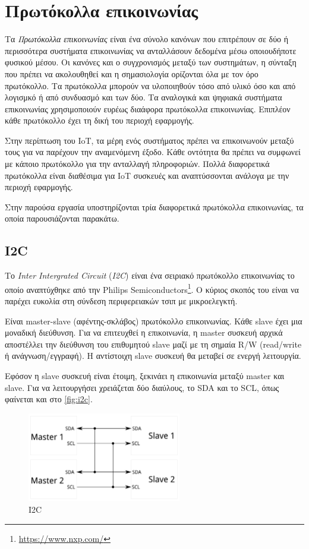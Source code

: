 \section{Πρωτόκολλα επικοινωνίας}
\label{sec:theory_protocols}

Τα \textit{Πρωτόκολλα επικοινωνίας} είναι ένα σύνολο κανόνων που επιτρέπουν σε δύο ή περισσότερα συστήματα επικοινωνίας να ανταλλάσουν δεδομένα μέσω οποιουδήποτε φυσικού μέσου. Οι κανόνες και ο συγχρονισμός μεταξύ των συστημάτων, η σύνταξη που πρέπει να ακολουθηθεί και η σημασιολογία ορίζονται όλα με τον όρο πρωτόκολλο. Τα πρωτόκολλα μπορούν να υλοποιηθούν τόσο από υλικό όσο και από λογισμκό ή από συνδυασμό και των δύο. Τα αναλογικά και ψηφιακά συστήματα επικοινωνίας χρησιμοποιούν ευρέως διαάφορα πρωτόκολλα επικοινωνίας. Επιπλέον κάθε πρωτόκολλο έχει τη δική του περιοχή εφαρμογής.

Στην περίπτωση του IoT, τα μέρη ενός συστήματος πρέπει να επικοινωνούν μεταξύ τους για να παρέχουν την αναμενόμενη έξοδο. Κάθε οντότητα θα πρέπει να συμφωνεί με κάποιο πρωτόκολλο για την ανταλλαγή πληροφοριών. Πολλά διαφορετικά πρωτόκολλα είναι διαθέσιμα για IoT συσκευές και αναπτύσσονται ανάλογα με την περιοχή εφαρμογής.

Στην παρούσα εργασία υποστηρίζονται τρία διαφορετικά πρωτόκολλα επικοινωνίας, τα οποία παρουσιάζονται παρακάτω.

\subsection{I2C}
\label{subsec:i2c}

Το \textit{Inter Intergrated Circuit} (\textit{I2C}) είναι ένα σειριακό πρωτόκολλο επικοινωνίας το οποίο αναπτύχθηκε από την Philips Semiconductors\footnote{\url{https://www.nxp.com/}}. Ο κύριος σκοπός του είναι να παρέχει ευκολία στη σύνδεση περιφερειακών τσιπ με μικροελεγκτή. 

Είναι master-slave (αφέντης-σκλάβος) πρωτόκολλο επικοινωνίας. Κάθε slave έχει μια μοναδική διεύθυνση. Για να επιτευχθεί η επικοινωνία, η master συσκευή αρχικά αποστέλλει την διεύθυνση του επιθυμητού slave μαζί με τη σημαία R/W (read/write ή ανάγνωση/εγγραφή). Η αντίστοιχη slave συσκευή θα μεταβεί σε ενεργή λειτουργία.

Εφόσον η slave συσκευή είναι έτοιμη, ξεκινάει η επικοινωνία μεταξύ master και slave. Για να λειτουργήσει χρειάζεται δύο διαύλους, το SDA και το SCL, όπως φαίνεται και στο \autoref{fig:i2c}.

\begin{figure}[!ht]
	\centering
	\includegraphics[width=0.6\textwidth]{./images/chapter2/i2c.png}
	\caption{I2C}
	\label{fig:i2c}
\end{figure}

